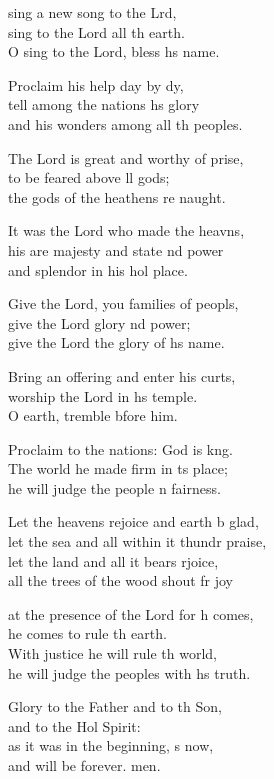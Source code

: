 \settowidth{\versewidth}{let the sea and all within it thunder praise,}
\begin{psalmverse}%
  \begin{patverse}
 sing a new song to the Lrd,\Flex\\
sing to the Lord all th earth.\Med\\
O sing to the Lord, bless h\pointup{\i}s name.

Proclaim his help day by dy,\Flex\\
tell among the nations h\pointup{\i}s glory\Med\\
and his wonders among all th peoples.

The Lord is great and worthy of prise,\Flex\\
to be feared above ll gods;\Med\\
the gods of the heathens re naught.

It was the Lord who made the heavns,\Flex\\
his are majesty and state nd power\Med\\
and splendor in his hol place.

Give the Lord, you families of peopls,\Flex\\
give the Lord glory nd power;\Med\\
give the Lord the glory of h\pointup{\i}s name.

Bring an offering and enter his curts,\Flex\\
worship the Lord in h\pointup{\i}s temple.\Med\\
O earth, tremble bfore him.

Proclaim to the nations: God is k\pointup{\i}ng.\Flex\\
The world he made firm in \pointup{\i}ts place;\Med\\
he will judge the people \pointup{\i}n fairness.

Let the heavens rejoice and earth b glad,\Med\\
let the sea and all within it thundr praise,\\
let the land and all it bears rjoice,\Med\\
all the trees of the wood shout fr joy

at the presence of the Lord for h comes,\Med\\
he comes to rule th earth.\\
With justice he will rule th world,\Med\\
he will judge the peoples with h\pointup{\i}s truth.

Glory to the Father and to th Son,\Med\\
and to the Hol Spirit:\\
as it was in the beginning, \pointup{\i}s now,\Med\\
and will be forever. men. 
  \end{patverse}
\end{psalmverse}
